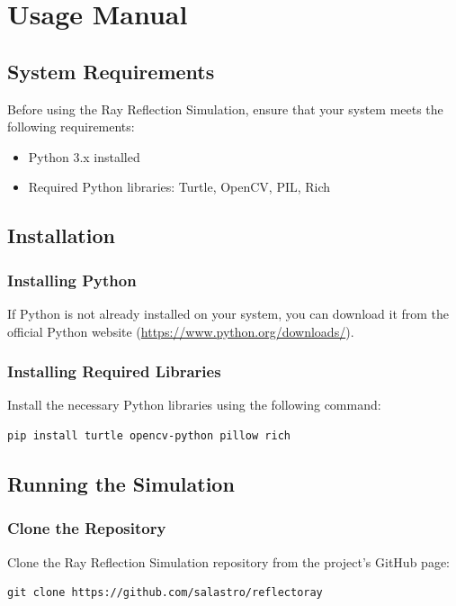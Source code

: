 \documentclass{article}
\begin{document}
\section{Usage Manual}

\subsection{System Requirements}
Before using the Ray Reflection Simulation, ensure that your system meets the following requirements:

\begin{itemize}
    \item Python 3.x installed
    \item Required Python libraries: Turtle, OpenCV, PIL, Rich
\end{itemize}

\subsection{Installation}

\subsubsection{Installing Python}
If Python is not already installed on your system, you can download it from the official Python website (\url{https://www.python.org/downloads/}).

\subsubsection{Installing Required Libraries}
Install the necessary Python libraries using the following command:

\begin{verbatim}
pip install turtle opencv-python pillow rich
\end{verbatim}

\subsection{Running the Simulation}

\subsubsection{Clone the Repository}
Clone the Ray Reflection Simulation repository from the project's GitHub page:

\begin{verbatim}
git clone https://github.com/salastro/reflectoray
\end{verbatim}
\end{document}
